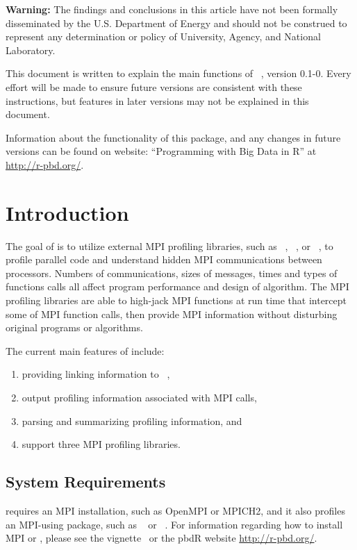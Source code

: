 {\color{red} \bf Warning:}
The findings and conclusions in this article have not been
formally disseminated by the U.S. Department of Energy
and should not be construed to represent any determination or
policy of University, Agency, and National Laboratory.

This document is written to explain the main
functions of ~\citep{Sehrawat2013pbdPROFpackage}, version 0.1-0.
Every effort will be made to ensure future versions are consistent with
these instructions, but features in later versions may not be explained
in this document.

Information about the functionality of this package,
and any changes in future versions can be found on website:
``Programming with Big Data in R'' at
\url{http://r-pbd.org/}.



\section{Introduction}
\label{sec:introduction}

The goal of  is to utilize external MPI profiling libraries,
such as ~\citep{fpmpi}, ~\citep{mpiP}, or
~\citep{TAU},
to profile parallel  code and understand hidden MPI
communications between processors. Numbers of communications,
sizes of messages, times and types of functions calls all affect program
performance and design of algorithm. The MPI profiling libraries are able to
high-jack MPI functions at run time that intercept some of MPI function calls,
then provide MPI information without disturbing original programs or algorithms.

The current main features of  include:
\begin{enumerate}
\item providing linking information to ~\citep{pbdR2012},
\item output profiling information associated with MPI calls,
\item parsing and summarizing profiling information, and
\item support three MPI profiling libraries.
\end{enumerate}


\subsection[System Requirements]{System Requirements}
\label{sec:system_requirements}

 requires an MPI installation, such as OpenMPI or MPICH2,
and it also profiles an MPI-using package, such as
~\citep{Chen2012pbdMPIpackage} or ~\citep{Yu2002}.
For information regarding how to install MPI or , please see the  vignette~\citep{Chen2012pbdMPIvignette} or the pbdR website \url{http://r-pbd.org/}.

